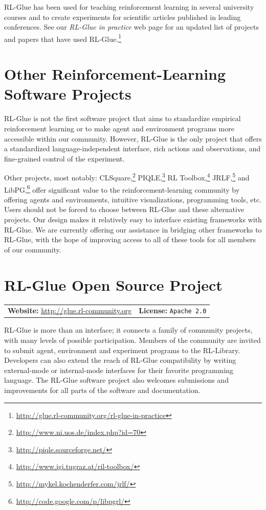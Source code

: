 \documentclass[twoside,11pt]{article}
\begin{document}
RL-Glue has been used for teaching reinforcement learning in several university courses and to create experiments for scientific articles published in leading conferences.  See our \textit{RL-Glue in practice} web page for an updated list of projects and papers that have used RL-Glue.\footnote{\url{http://glue.rl-community.org/rl-glue-in-practice}} 



\vspace{-0.2cm}
\section{Other Reinforcement-Learning Software Projects}
\vspace{-0.2cm}
RL-Glue is not the first software project that aims to  standardize empirical reinforcement learning or to make agent and environment programs more accessible within our community.  However, RL-Glue is the only project that offers a standardized language-independent interface, rich actions and observations, and fine-grained control of the experiment.

Other projects, most notably: CLSquare,\footnote{\url{http://www.ni.uos.de/index.php?id=70}}  PIQLE,\footnote{\url{http://piqle.sourceforge.net/}} RL Toolbox,\footnote{\url{http://www.igi.tugraz.at/ril-toolbox/}
} JRLF,\footnote{\url{http://mykel.kochenderfer.com/jrlf/}}  and LibPG,\footnote{\url{http://code.google.com/p/libpgrl/}} offer significant value to the reinforcement-learning community by offering agents and environments, intuitive visualizations, programming tools, etc.  Users should not be forced to choose between RL-Glue and these alternative projects. Our design makes it relatively easy to interface existing frameworks with RL-Glue.  We are currently offering our assistance in bridging other frameworks to RL-Glue, with the hope of improving access to all of these tools for all members of our community.

 
\vspace{-0.2cm}
\section{RL-Glue Open Source Project}
\vspace{-0.2cm}
\begin{tabular}{ l l}
  \textbf{Website:} \url{http://glue.rl-community.org}  & \textbf{License:} \texttt{Apache 2.0}  \end{tabular}
\newline
\newline
RL-Glue is more than an interface; it connects a family of community projects, with many levels of possible participation. Members of the community are invited to submit agent, environment and experiment programs to the RL-Library. Developers can also extend the reach of RL-Glue compatibility by writing external-mode or internal-mode interfaces for their favorite programming language.  The RL-Glue software project also welcomes submissions and improvements for all parts of the software and documentation.  
\end{document}
